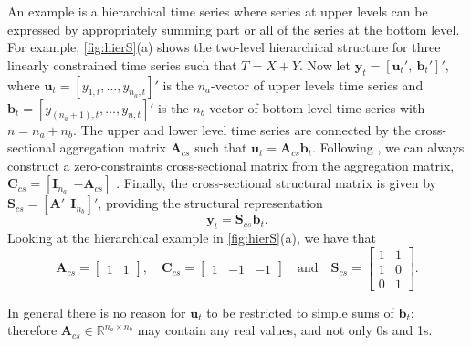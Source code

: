 \documentclass[a4paper,11pt]{article}
\newcommand{\bvet}{\bm{b}}
\newcommand{\uvet}{\bm{u}}
\newcommand{\yvet}{\bm{y}}
\newcommand{\Avet}{\bm{A}}
\newcommand{\Cvet}{\bm{C}}
\newcommand{\Ivet}{\bm{I}}
\newcommand{\Svet}{\bm{S}}
\theoremstyle{definition}
\begin{document}
An example is a hierarchical time series where series at upper levels can be expressed by appropriately summing part or all of the series at the bottom level. For example, \autoref{fig:hierS}(a) shows the two-level hierarchical structure for three linearly constrained time series such that $T = X + Y$. Now let $\yvet_t = [\uvet_t',~ \bvet_t']'$, where $\uvet_t = [y_{1,t}, \dots, y_{n_a,t}]'$ is the $n_a$-vector of upper levels time series and $\bvet_t = [y_{(n_a+1),t}, \dots, y_{n,t}]'$ is the $n_b$-vector of bottom level time series with $n = n_a+n_b$. The upper and lower level time series are connected by the cross-sectional aggregation matrix $\Avet_{cs}$ such that $\uvet_t = \Avet_{cs}\bvet_t$. Following \cite{giro2022}, we can always construct a zero-constraints cross-sectional matrix from the aggregation matrix, $\Cvet_{cs}=[\Ivet_{n_a} ~~ {-\Avet_{cs}}]$ . Finally, the cross-sectional structural matrix is given by $\Svet_{cs} = [\Avet' ~~ \Ivet_{n_b}]'$, providing the structural representation \citep{hyndman2011}
$$
	\yvet_t = \Svet_{cs} \bvet_t.
$$
Looking at the hierarchical example in \autoref{fig:hierS}(a), we have that
$$
	\Avet_{cs} = \begin{bmatrix} 1 & 1 \end{bmatrix}, \quad \Cvet_{cs} = \begin{bmatrix}1 & -1 & -1 \end{bmatrix} \quad \text{and} \quad \Svet_{cs} = \begin{bmatrix}
		1 & 1 \\
		1 & 0 \\
		0 & 1
	\end{bmatrix}.
$$

In general there is no reason for $\uvet_t$ to be restricted to simple sums of $\bvet_t$; therefore $\Avet_{cs} \in \mathbb{R}^{n_a\times n_b}$ may contain any real values, and not only 0s and 1s.
\end{document}
